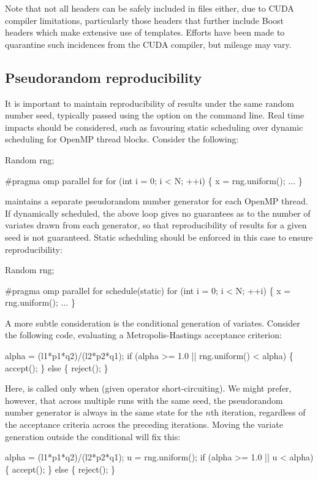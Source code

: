 Note that not all  headers can be safely included in 
files either, due to CUDA compiler limitations, particularly those headers
that further include Boost headers which make extensive use of
templates. Efforts have been made to quarantine such incidences from the CUDA
compiler, but mileage may vary.

\subsection{Pseudorandom reproducibility\label{Pseudorandom_reproducibility}}

It is important to maintain reproducibility of results under the same random
number seed, typically passed using the
 option on the command line. Real time impacts should be
considered, such as favouring static scheduling over
dynamic scheduling for OpenMP thread
blocks. Consider the following:
\begin{cppcode}
Random rng;

#pragma omp parallel for
for (int i = 0; i < N; ++i) \{
  x = rng.uniform();
  \(\ldots\)
\}
\end{cppcode}

 maintains a separate pseudorandom number
generator for each OpenMP thread. If
dynamically scheduled, the above loop gives no guarantees as to the number of
variates drawn from each generator, so that reproducibility of results for a
given seed is not guaranteed. Static scheduling should be enforced in this
case to ensure reproducibility:
\begin{cppcode}
Random rng;

#pragma omp parallel for schedule(static)
for (int i = 0; i < N; ++i) \{
  x = rng.uniform();
  \(\ldots\)
\}
\end{cppcode}

A more subtle consideration is the conditional generation of
variates. Consider the following code, evaluating a
Metropolis-Hastings acceptance criterion:
\begin{cppcode}
alpha = (l1*p1*q2)/(l2*p2*q1);
if (alpha >= 1.0 || rng.uniform() < alpha) \{
  accept();
\} else \{
  reject();
\}
\end{cppcode}
Here,  is called only when  (given
operator short-circuiting). We might prefer, however, that across multiple
runs with the same seed, the pseudorandom number generator is always in the
same state for the $n$th iteration, regardless of the acceptance criteria
across the preceding iterations. Moving the variate generation outside the
conditional will fix this:
\begin{cppcode}
alpha = (l1*p1*q2)/(l2*p2*q1);
u = rng.uniform();
if (alpha >= 1.0 || u < alpha) \{
  accept();
\} else \{
  reject();
\}
\end{cppcode}

